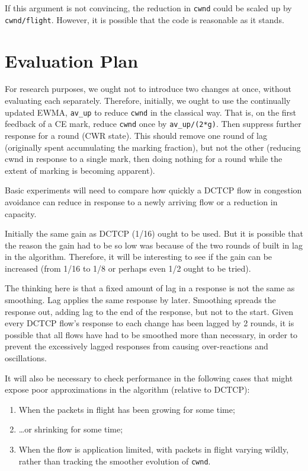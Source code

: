 If this argument is not convincing, the reduction in \texttt{cwnd} could be scaled up by \texttt{cwnd/flight}. However, it is possible that the code is reasonable as it stands.

\section{Evaluation Plan}\label{prresp_Evaluation}

For research purposes, we ought not to introduce two changes at once, without evaluating each separately. Therefore, initially, we ought to use the continually updated EWMA, \texttt{av\_up} to reduce \texttt{cwnd} in the classical way. That is, on the first feedback of a CE mark, reduce \texttt{cwnd} once by \texttt{av\_up/(2*g)}. Then suppress further response for a round (CWR state). This should remove one round of lag (originally spent accumulating the marking fraction), but not the other (reducing cwnd in response to a single mark, then doing nothing for a round while the extent of marking is becoming apparent).

Basic experiments will need to compare how quickly a DCTCP flow in congestion avoidance can reduce in response to a newly arriving flow or a reduction in capacity.

Initially the same gain as DCTCP (1/16) ought to be used. But it is possible that the reason the gain had to be so low was because of the two rounds of built in lag in the algorithm. Therefore, it will be interesting to see if the gain can be increased (from 1/16 to 1/8 or perhaps even 1/2 ought to be tried).

The thinking here is that a fixed amount of lag in a response is not the same as smoothing. Lag applies the same response by later. Smoothing spreads the response out, adding lag to the end of the response, but not to the start. Given every DCTCP flow's response to each change has been lagged by 2 rounds, it is possible that all flows have had to be smoothed more than necessary, in order to prevent the excessively lagged responses from causing over-reactions and oscillations.

It will also be necessary to check performance in the following cases that might expose poor approximations in the algorithm (relative to DCTCP):
\begin{enumerate}
	\item When the packets in flight has been growing for some time;
	\item \ldots{}or shrinking for some time;
	\item When the flow is application limited, with packets in flight varying wildly, rather than tracking the smoother evolution of \texttt{cwnd}.
\end{enumerate}

